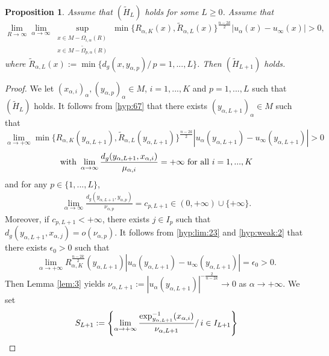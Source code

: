 \documentclass[reqno]{amsart}
\newtheorem{proposition}{Proposition}[section]
\def \eps {\epsilon}
\def \ua {u_\alpha}
\def \xai {x_{\alpha,i}}
\def \mai {\mu_{\alpha,i}}
\def \xaj {x_{\alpha,j}}
\def \nap {\nu_{\alpha,p}}
\def \yap {y_{\alpha,p}}
\begin{document}
\begin{proposition} Assume that $(\tilde{H}_L)$ holds for some $L\geq 0$. Assume that
\begin{equation}\label{hyp:67}
\lim_{R\to \infty}\lim_{\alpha\to \infty}\sup_{\begin{array}{c}
x\in M-\Omega_{i,\alpha}(R)\\
x\in M- \tilde{\Omega}_{p,\alpha}(R)\end{array}}\min\{R_{\alpha,K}(x),\tilde{R}_{\alpha,L}(x)\}^{\frac{n-2k}{2}}|\ua(x)-u_\infty(x)|>0,
\end{equation}
where $\tilde{R}_{\alpha,L}(x):=\min\{d_g(x, \yap)/\, p=1,...,L\}$. Then $(\tilde{H}_{L+1})$ holds.
\end{proposition}
\begin{proof} We let $(\xai)_\alpha, (\yap)_\alpha\in M$, $i=1,...,K$ and $p=1,...,L$ such that $(\tilde{H}_L)$ holds. It follows from \eqref{hyp:67} that there exists $(y_{\alpha,L+1})_\alpha\in M$ such that 
\begin{equation}\label{hyp:lim:23}
\lim_{\alpha\to +\infty}\min\{R_{\alpha,K}(y_{\alpha,L+1}),\tilde{R}_{\alpha,L}(y_{\alpha,L+1})\}^{\frac{n-2k}{2}}|\ua(y_{\alpha,L+1})-u_\infty(y_{\alpha,L+1})|>0
\end{equation}
\begin{equation}\label{eq:49}
 \hbox{with }\lim_{\alpha\to \infty}\frac{d_g(y_{\alpha,L+1},\xai)}{\mai}=+\infty\hbox{ for all }i=1,...,K
 \end{equation}
and for any $p\in \{1,...,L\}$,
\begin{equation}\label{eq:45}
\begin{array}{c}
\lim_{\alpha\to \infty}\frac{d_g(y_{\alpha,L+1},\yap)}{\nap}=c_{p,L+1}\in (0,+\infty)\cup \{+\infty\}.
\end{array}
\end{equation}
Moreover, if $c_{p,L+1}<+\infty$, there exists $j\in I_p$ such that $d_g(y_{\alpha,L+1},\xaj)=o(\nap)$. It follows from \eqref{hyp:lim:23} and \eqref{hyp:weak:2} that there exists $\eps_0>0$ such that
\begin{equation*}
\lim_{\alpha\to +\infty} R_{\alpha,K}^{\frac{n-2k}{2}}(y_{\alpha, L+1})|\ua(y_{\alpha,L+1})-u_\infty(y_{\alpha,L+1})|=\eps_0>0.
\end{equation*}
Then Lemma \ref{lem:3} yields $\nu_{\alpha,L+1}:=|\ua(y_{\alpha, L+1})|^{-\frac{2}{n-2k}}\to 0$ as $\alpha\to +\infty$. We set
$$S_{L+1}:=\left\{\lim_{\alpha\to +\infty}\frac{\hbox{exp}_{y_{\alpha, L+1}}^{-1}(\xai)}{\nu_{\alpha,L+1}}/\,i\in I_{L+1}\right\}$$

\end{proof}
\end{document}
